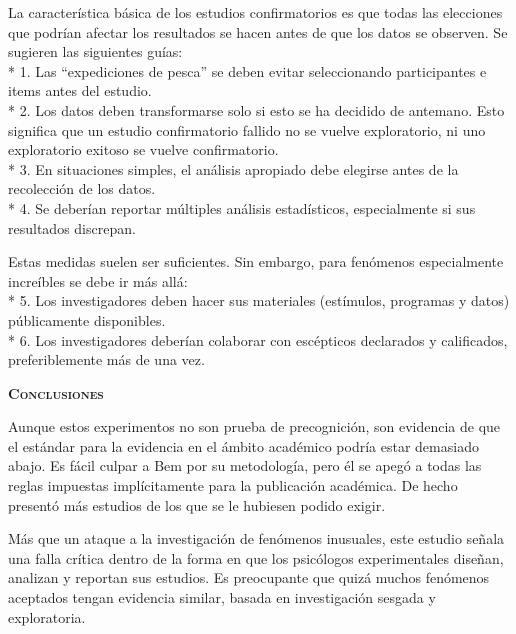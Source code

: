 \documentclass[a4paper,12pt]{article}
\begin{document}
La característica básica de los estudios confirmatorios es que todas las elecciones que podrían afectar los resultados se hacen antes de que los datos se observen. Se sugieren las siguientes guías:\\*
1. Las ``expediciones de pesca'' se deben evitar seleccionando participantes e items antes del estudio.\\*
2. Los datos deben transformarse solo si esto se ha decidido de antemano. Esto significa que un estudio confirmatorio fallido no se vuelve exploratorio, ni uno exploratorio exitoso se vuelve confirmatorio.\\*
3. En situaciones simples, el análisis apropiado debe elegirse antes de la recolección de los datos.\\*
4. Se deberían reportar múltiples análisis estadísticos, especialmente si sus resultados discrepan.

Estas medidas suelen ser suficientes. Sin embargo, para fenómenos especialmente increíbles se debe ir más allá:\\*
5. Los investigadores deben hacer sus materiales (estímulos, programas y datos) públicamente disponibles.\\*
6. Los investigadores deberían colaborar con escépticos declarados y calificados, preferiblemente más de una vez.

{\scshape\bfseries Conclusiones}

Aunque estos experimentos no son prueba de precognición, son evidencia de que el estándar para la evidencia en el ámbito académico podría estar demasiado abajo. Es fácil culpar a Bem por su metodología, pero él se apegó a todas las reglas impuestas implícitamente para la publicación académica. De hecho presentó más estudios de los que se le hubiesen podido exigir.

Más que un ataque a la investigación de fenómenos inusuales, este estudio señala una falla crítica dentro de la forma en que los psicólogos experimentales diseñan, analizan y reportan sus estudios. Es preocupante que quizá muchos fenómenos aceptados tengan evidencia similar, basada en investigación sesgada y exploratoria.
\end{document}
